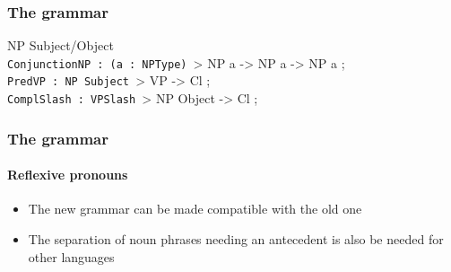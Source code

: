 \documentclass[10pt]{beamer}
\renewcommand{\baselinestretch}{1.5}
\begin{document}
\begin{frame}%
\frametitle{The grammar}
NP Subject/Object\\
\pause 
\verb-ConjunctionNP : (a : NPType) -> NP a -> NP a -> NP a ;\\
\verb-PredVP : NP Subject -> VP -> Cl ; \\
\verb-ComplSlash : VPSlash -> NP Object -> Cl ;\\
\end{frame}

\begin{frame}
\frametitle{The grammar}
\framesubtitle{Reflexive pronouns} 
\begin{itemize}
\item{The new grammar can be made compatible with the old one}
\item{The separation of noun phrases needing an antecedent is
also be needed for other languages}
\end{itemize}
\end{frame}



\end{document}
